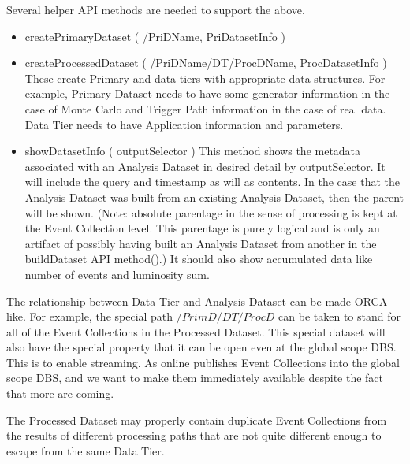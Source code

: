 \documentclass[pdftex]{cmspaper}
\begin{document}
Several helper API methods are needed to support the above.  

\begin{itemize}
\item  createPrimaryDataset ( /PriDName, PriDatasetInfo )
\item  createProcessedDataset ( /PriDName/DT/ProcDName, ProcDatasetInfo )
      These create Primary and data tiers with appropriate data
      structures.  For example, Primary Dataset needs to have some
      generator information in the case of Monte Carlo and Trigger Path
      information in the case of real data.  Data Tier needs to have
      Application information and parameters.

\item  showDatasetInfo ( outputSelector )
      This method shows the metadata associated with an Analysis Dataset
      in desired detail by outputSelector.  It will include the query
      and timestamp as will as contents.  In the case that the Analysis
      Dataset was built from an existing Analysis Dataset, then the parent
      will be shown.  (Note: absolute parentage in the sense of processing
      is kept at the Event Collection level.  This parentage is purely
      logical and is only an artifact of possibly having built an Analysis
      Dataset from another in the buildDataset API method().)  It should
      also show accumulated data like number of events and luminosity sum.

\end{itemize}

The relationship between Data Tier and Analysis Dataset can be made
ORCA-like.  For example, the special path $/PrimD/DT/ProcD$ can be taken to
stand for all of the Event Collections in the Processed Dataset. This special 
dataset will also have the special property that it can be open even at the
global scope DBS.  This is to enable streaming.  As online publishes
Event Collections into the global scope DBS, and we want to make them
immediately available despite the fact that more are coming.

The Processed Dataset may properly contain duplicate Event Collections from
the results of different processing paths that are not quite different
enough to escape from the same Data Tier. 
\end{document}
